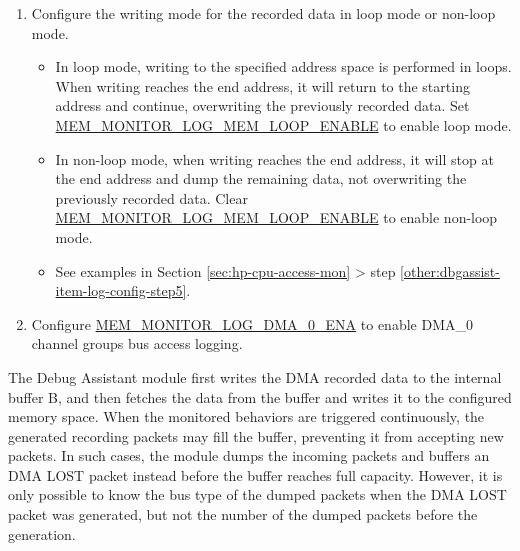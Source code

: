 \documentclass[main\_\_EN.tex]{subfiles}
\begin{document}
\begin{enumerate}
        \begin{itemize}
            \item \hyperref[regdesc:MEMMONITORLOGMEMSTARTREG]{MEM\_MONITOR\_LOG\_MEM\_START\_REG} and \hyperref[regdesc:MEMMONITORLOGMEMENDREG]{MEM\_MONITOR\_LOG\_MEM\_END\_REG} specify the storage space for recorded data. The storage space must be in the range of 0x4080\_0000 \verb+~+ 0x4085\_FFFF.
            \item Set \hyperref[regdesc:MEMMONITORLOGMEMADDRUPDATEREG]{MEM\_MONITOR\_LOG\_MEM\_ADDR\_UPDATE\_REG} to update the value in \hyperref[regdesc:MEMMONITORLOGMEMCURRENTADDRREG]{MEM\_MONITOR\_LOG\_MEM\_CURRENT\_ADDR\_REG} to \hyperref[regdesc:MEMMONITORLOGMEMSTARTREG]{MEM\_MONITOR\_LOG\_MEM\_START\_REG}.
            \item Configure the permission for the Debug Assistant module to access the HP SRAM. Only when the access permission is enabled can the Debug Assistant module access the HP SRAM. For more information, please refer to Chapter \ref{mod:permctrl} \textit{}.
        \end{itemize}
    \item Configure the writing mode for the recorded data in loop mode or non-loop mode.
        \begin{itemize}
            \item In loop mode, writing to the specified address space is performed in loops. When writing reaches the end address, it will return to the starting address and continue, overwriting the previously recorded data. Set \hyperref[fielddesc:MEMMONITORLOGMEMLOOPENABLE]{MEM\_MONITOR\_LOG\_MEM\_LOOP\_ENABLE} to enable loop mode.
            \item In non-loop mode, when writing reaches the end address, it will stop at the end address and dump the remaining data, not overwriting the previously recorded data. Clear \hyperref[fielddesc:MEMMONITORLOGMEMLOOPENABLE]{MEM\_MONITOR\_LOG\_MEM\_LOOP\_ENABLE} to enable non-loop mode.
            \item See examples in Section \ref{sec:hp-cpu-access-mon} > step \ref{other:dbgassist-item-log-config-step5}.
        \end{itemize}
    \item Configure \hyperref[fielddesc:MEMMONITORLOGDMA0ENA]{MEM\_MONITOR\_LOG\_DMA\_0\_ENA} to enable DMA\_0 channel groups bus access logging.
\end{enumerate}

The Debug Assistant module first writes the DMA recorded data to the internal buffer B, and then fetches the data from the buffer and writes it to the configured memory space. When the monitored behaviors are triggered continuously, the generated recording packets may fill the buffer, preventing it from accepting new packets. In such cases, the module dumps the incoming packets and buffers an DMA LOST packet instead before the buffer reaches full capacity. However, it is only possible to know the bus type of the dumped packets when the DMA LOST packet was generated, but not the number of the dumped packets before the generation.
\end{document}

